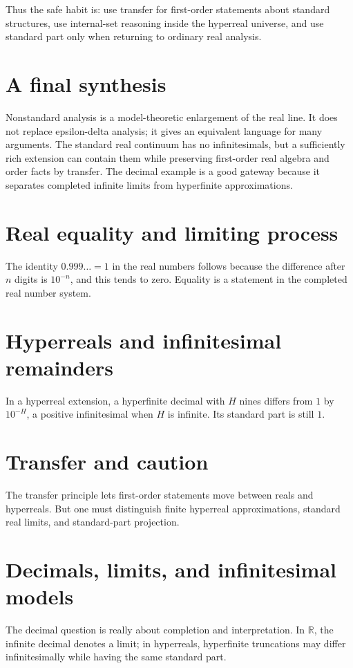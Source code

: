 Thus the safe habit is: use transfer for first-order statements about standard structures, use internal-set reasoning inside the hyperreal universe, and use standard part only when returning to ordinary real analysis.

\section{A final synthesis}

Nonstandard analysis is a model-theoretic enlargement of the real line.  It does not replace epsilon-delta analysis; it gives an equivalent language for many arguments.  The standard real continuum has no infinitesimals, but a sufficiently rich extension can contain them while preserving first-order real algebra and order facts by transfer.  The decimal example is a good gateway because it separates completed infinite limits from hyperfinite approximations.

\section{Real equality and limiting process}
The identity \(0.999\ldots=1\) in the real numbers follows because the difference after \(n\) digits is \(10^{-n}\), and this tends to zero.  Equality is a statement in the completed real number system.
\section{Hyperreals and infinitesimal remainders}
In a hyperreal extension, a hyperfinite decimal with \(H\) nines differs from \(1\) by \(10^{-H}\), a positive infinitesimal when \(H\) is infinite.  Its standard part is still \(1\).
\section{Transfer and caution}
The transfer principle lets first-order statements move between reals and hyperreals.  But one must distinguish finite hyperreal approximations, standard real limits, and standard-part projection.
\section{Decimals, limits, and infinitesimal models}
The decimal question is really about completion and interpretation.  In \(\mathbb R\), the infinite decimal denotes a limit; in hyperreals, hyperfinite truncations may differ infinitesimally while having the same standard part.
